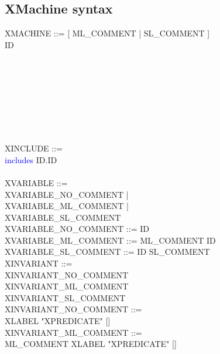 \subsection{XMachine syntax}
\label{sec:xmachine-syntax}
\begin{center}
  \begin{Bcode}
    XMACHINE ::= [ ML_COMMENT | SL_COMMENT ]\\
    \Btab \Btab \Bmachine{} ID \\
    \Btab {}\\
    \Btab \Btab [\Brefines{} ID]\\
    \Btab \Btab [\Bsees{} ID \{ ID \}]\\
    \Btab {}\\
    \Btab {}\\
    \Btab {}\\
    \Btab {} \\
    \Btab \Btab \Bend \\
    XINCLUDE ::= \\
    \Btab \Btab \textcolor{blue}{includes} ID.ID\\
    \Btab {}\\
    XVARIABLE ::= \\
    \Btab \Btab XVARIABLE\_NO\_COMMENT | \\
    \Btab \Btab XVARIABLE\_ML\_COMMENT | \\
    \Btab \Btab XVARIABLE\_SL\_COMMENT \\
    XVARIABLE\_NO\_COMMENT ::= ID \\
    XVARIABLE\_ML\_COMMENT ::= ML\_COMMENT ID \\
    XVARIABLE\_SL\_COMMENT ::= ID SL\_COMMENT \\
    XINVARIANT ::=\\
    \Btab \Btab XINVARIANT\_NO\_COMMENT\\
    \Btab \Btab XINVARIANT\_ML\_COMMENT\\
    \Btab \Btab XINVARIANT\_SL\_COMMENT\\
    XINVARIANT\_NO\_COMMENT ::= \\
    \Btab \Btab XLABEL "XPREDICATE" [\Btheorem] \\
    XINVARIANT\_ML\_COMMENT ::= \\
    \Btab \Btab ML\_COMMENT XLABEL "XPREDICATE" [\Btheorem]\\

\end{Bcode}
\end{center}
